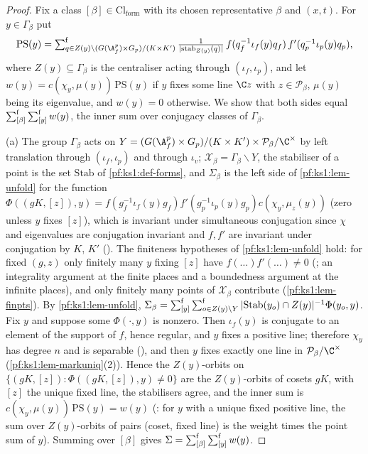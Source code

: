 \begin{proof}
Fix a class $[\beta]\in\mathrm{Cl}_{\mathrm{form}}$ with its chosen representative $\beta$ and $(x,t)$. For $y\in\Gamma_\beta$ put
\[\mathrm{PS}(y)=\ksonefs_{q\in Z(y)\backslash(G(\ksoneAfp)\times G_p)/(K\times K')}\frac{1}{|\mathrm{stab}_{Z(y)}(q)|}\,
f(q_f^{-1}\iota_f(y)q_f)\,f'(q_p^{-1}\iota_p(y)q_p),\]
where $Z(y)\subseteq\Gamma_\beta$ is the centraliser acting through $(\iota_f,\iota_p)$, and let $w(y)=c(\chi_y,\mu(y))\,\mathrm{PS}(y)$ if
$y$ fixes some line $\C z$ with $z\in\mathcal P_\beta$, $\mu(y)$ being its eigenvalue, and $w(y)=0$ otherwise. We show that both
sides equal $\textstyle\sum\nolimits^{\mathrm f}_{[\beta]}\textstyle\sum\nolimits^{\mathrm f}_{[y]}w(y)$, the inner sum over conjugacy classes of $\Gamma_\beta$.

(a) The group $\Gamma_\beta$ acts on $Y=(G(\ksoneAfp)\times G_p)/(K\times K')\times\mathcal P_\beta/\C^\times$ by left translation
through $(\iota_f,\iota_p)$ and through $\iota_v$; $\mathcal X_\beta=\Gamma_\beta\backslash Y$, the stabiliser of a point is the set
$\mathrm{Stab}$ of \cref{pf:ks1:def-forms}, and $\Sigma_\beta$ is the left side of \cref{pf:ks1:lem-unfold} for the function
$\Phi((gK,[z]),y)=f(g_f^{-1}\iota_f(y)g_f)f'(g_p^{-1}\iota_p(y)g_p)c(\chi_y,\mu_z(y))$ (zero unless $y$ fixes $[z]$), which is
invariant under simultaneous conjugation since $\chi$ and eigenvalues are conjugation invariant and $f,f'$ are invariant under
conjugation by $K$, $K'$ (). The finiteness hypotheses of \cref{pf:ks1:lem-unfold}
hold: for fixed $(g,z)$ only finitely many $y$ fixing $[z]$ have $f(\dots)f'(\dots)\neq0$
(; an integrality argument at the finite places and a boundedness argument at the
infinite places), and only finitely many points of $\mathcal X_\beta$
contribute (\cref{pf:ks1:lem-finpts}). By \cref{pf:ks1:lem-unfold},
$\Sigma_\beta=\textstyle\sum\nolimits^{\mathrm f}_{[y]}\textstyle\sum\nolimits^{\mathrm f}_{o\in Z(y)\backslash Y}|\mathrm{Stab}(y_o)\cap Z(y)|^{-1}\Phi(y_o,y)$. Fix $y$ and suppose some
$\Phi(\cdot,y)$ is nonzero. Then $\iota_f(y)$ is conjugate to an element of the support of $f$, hence regular, and $y$ fixes a positive
line; therefore $\chi_y$ has degree $n$ and is separable (), and then $y$ fixes
exactly one line in $\mathcal P_\beta/\C^\times$ (\cref{pf:ks1:lem-markuniq}(2)).
Hence the $Z(y)$-orbits on $\{(gK,[z]):\Phi((gK,[z]),y)\neq0\}$ are the $Z(y)$-orbits of cosets $gK$, with $[z]$ the unique fixed line,
the stabilisers agree, and the inner sum is $c(\chi_y,\mu(y))\,\mathrm{PS}(y)=w(y)$
(: for $y$ with a unique fixed positive line, the sum over
$Z(y)$-orbits of pairs (coset, fixed line) is the weight times the point sum of $y$).
Summing over $[\beta]$ gives $\Sigma=\textstyle\sum\nolimits^{\mathrm f}_{[\beta]}\textstyle\sum\nolimits^{\mathrm f}_{[y]}w(y)$.


\end{proof}
